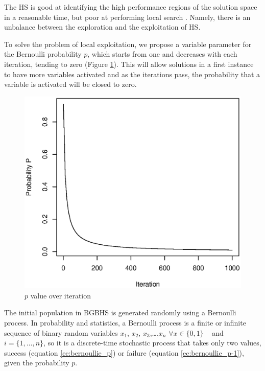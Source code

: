 The HS is good at identifying the high performance regions of the solution space in a reasonable time, but poor at performing local search \cite{DBLP:journals/eswa/XiangALHZ14}. Namely, there is an unbalance between the exploration and the exploitation of HS. 
 
To solve the problem of local exploitation, we propose a variable parameter for the Bernoulli probability $p$, which starts from one and decreases with each iteration, tending to zero (Figure \ref{fig:pvalue}). This will allow solutions in a first instance to have more variables activated and as the iterations pass, the probability that a variable is activated will be closed to zero.
 

\begin{figure}[]
\centering
\includegraphics[scale=.45]{Implementacion/img/p_bernoulli.eps}
\caption{$p$ value over iteration}
\label{fig:pvalue}
\end{figure}


The initial population in BGBHS is generated randomly using a Bernoulli process. In probability and statistics, a Bernoulli process is a finite or infinite sequence of binary random variables $x_1$, $x_2$, $x_3$,\dots,$x_n$  $\forall x \in \{0,1\}$ ~ and ~ $i=\{1,\dots, n\}$, so it is a discrete-time stochastic process that takes only two values, success (equation \ref{ec:bernoullie_p}) or failure (equation \ref{ec:bernoullie_p-1}), given the probability $p$.

